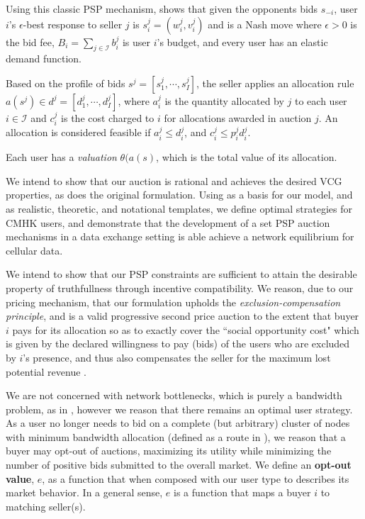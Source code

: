 \documentclass[12pt]{article}
\theoremstyle{definition}
\newcommand{\mcI}{\mathcal{I}}
\begin{document}
\begin{multicols}{2}
Using this classic PSP mechanism, \cite{lazar} shows that given the opponents
bids $s_{-i}$,
user $i$'s $\epsilon$-best response to seller $j$ is $s_i^j = (w_i^j, v_i^j)$
and is a Nash move
where $\epsilon > 0$ is the bid fee, $B_i =\sum_{j\in\mcI} b_i^j$ is user $i$'s
budget, and every user has an elastic demand function.

Based on the profile of bids $s^j = [s^j_1, \cdots , s^j_I]$, the seller applies
an allocation rule $a(s^j) \in d^j = [d_1^j, \cdots , d_I^j]$, where $a^j_i$ is the quantity allocated
by $j$ to each user $i\in\mcI$ and $c^j_i$ is the cost charged to $i$ for
allocations awarded in auction $j$. 
An allocation is considered feasible if $a^j_i \le d_i^j$, and $c^j_i \le  p^j_i d_i^j$.

Each user has a \emph{valuation} $\theta(a(s)$, which is the total value of its allocation.

We intend to show that our auction
is rational and achieves the desired VCG properties, as does the original
formulation. Using \cite{zheng} as a basis for our model, and \cite{lazar} as
realistic, theoretic, and notational templates, we define optimal strategies for
CMHK users, and demonstrate that the development of a set PSP auction mechanisms
in a data exchange setting is able achieve a network equilibrium for cellular data. 


We intend to show that our PSP constraints are
sufficient to attain the desirable property of truthfullness through incentive compatibility. We
reason, due to our pricing mechanism, that our formulation upholds the \emph{exclusion-compensation
principle}, and is a valid progressive second price auction to the extent that buyer $i$
pays for its allocation so as to exactly cover the ``social opportunity cost"
which is given by the declared willingness to pay (bids) of the users who are
excluded by $i$'s presence, and thus also compensates the seller for the maximum lost potential
revenue \cite{lazar}.

We are not concerned with network
bottlenecks, which is purely a bandwidth problem, as in \cite{semret}, however
we reason that there remains an optimal user strategy. As a user no longer needs
to bid on a complete (but arbitrary)
cluster of nodes with minimum bandwidth allocation (defined as a route in
\cite{semret}), we reason that a buyer may opt-out of auctions, maximizing its
utility while minimizing the number of positive bids submitted to the overall
market. We define an \textbf{opt-out
value}, $e$, as a function that when composed with our user type to describes
its market behavior. In a general sense, $e$ is %
a function that maps a buyer $i$ to matching seller(s).


\end{multicols}
\end{document}
